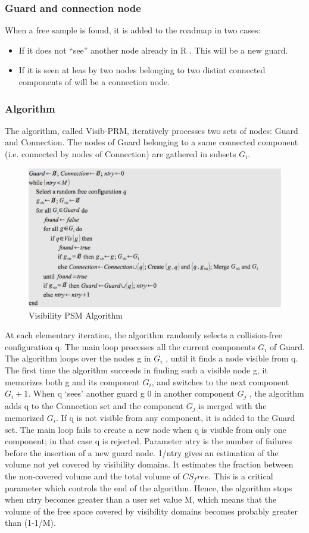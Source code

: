 \documentclass[11pt]{article}
\begin{document}
\subsubsection{Guard and connection node}
When a free sample is found, it is added to the roadmap in two cases:
\begin{itemize}
\item If it does not “see” another node already in R . This will be a new guard.
\item If it is seen at leas by two nodes belonging to two distint connected components of will be a connection node.
\end{itemize}
\subsubsection{Algorithm}
The algorithm, called Visib-PRM, iteratively processes two sets of nodes: Guard
and Connection. The nodes of Guard belonging to a same connected component
(i.e. connected by nodes of Connection) are gathered in subsets $G_i$.

\begin{figure}[h]
\includegraphics{visibility_psm_code}
\centering
\caption{Visibility PSM Algorithm}
\label{fig:roadmap_alg}
\end{figure}
At each elementary iteration, the algorithm randomly selects a collision-free
configuration q. The main loop processes all the current components $G_i$ of Guard. The algorithm loops over the nodes g in $G_i$ , until it finds a node visible from q. The
first time the algorithm succeeds in finding such a visible node g, it memorizes both
g and its component $G_i$, and switches to the next component $G_i+1$. When q ‘sees’
another guard g
0 in another component $G_j$ , the algorithm adds q to the Connection
set and the component $G_j$ is merged with the memorized $G_i$. If q is not visible from
any component, it is added to the Guard set. The main loop fails to create a new
node when q is visible from only one component; in that case q is rejected.
Parameter ntry is the number of failures before the insertion of a new guard node.
1/ntry gives an estimation of the volume not yet covered by visibility domains.
It estimates the fraction between the non-covered volume and the total volume of
$CS_free$. This is a critical parameter which controls the end of the algorithm. Hence,
the algorithm stops when ntry becomes greater than a user set value M, which
means that the volume of the free space covered by visibility domains becomes
probably greater than (1-1/M).
\end{document}
